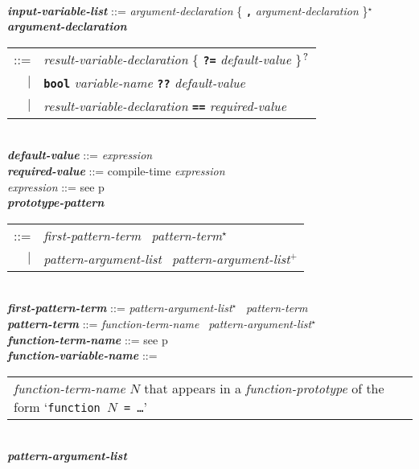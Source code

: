 \documentclass[12pt]{article}
\newcommand{\TT}[1]{{\tt \bfseries #1}}
\newcommand{\STAR}{{\Large $^\star$}}
\newcommand{\PLUS}[1][]{{$^{+#1}$}}
\newcommand{\QMARK}{{$^{\,\mbox{\footnotesize ?}}$}}
\newcommand{\emkey}[1]{{\em \bfseries #1}}
\newcommand{\pagref}[1]{p\pageref{#1}}
\newenvironment{indpar}[1][0.3in]%
	{\begin{list}{}%
		     {\setlength{\itemsep}{0in}%
		      \setlength{\topsep}{0in}%
		      \setlength{\parsep}{1ex}%
		      \setlength{\labelwidth}{#1}%
		      \setlength{\leftmargin}{#1}%
		      \addtolength{\leftmargin}{\labelsep}}%
	 \item}%
	{\end{list}}
\begin{document}
\begin{indpar}
\\[0.5ex]
\emkey{input-variable-list}
    ::= {\em argument-declaration}
                 \{ \TT{,} {\em argument-declaration} \}\STAR{}
\\[0.5ex]
\emkey{argument-declaration}\label{ARGUMENT-DECLARATION} \\
\hspace*{1in}\begin{tabular}[t]{@{}rl@{}}
    ::= & {\em result-variable-declaration}
          \{ \TT{?=} {\em default-value} \}\QMARK{} \\
    $|$ & \TT{bool} {\em variable-name}
          \TT{??} {\em default-value} \\
    $|$ & {\em result-variable-declaration}
          \TT{==} {\em required-value} \\
    \end{tabular}
\\[0.5ex]
\emkey{default-value} ::= {\em expression}
\\[0.5ex]
\emkey{required-value} ::= compile-time {\em expression}
\\[0.5ex]
{\em expression} ::= see \pagref{EXPRESSION}
\\[0.5ex]
\emkey{prototype-pattern}\label{PROTOTYPE-PATTERN}
    \begin{tabular}[t]{rl}
    ::= & {\em first-pattern-term}~ {\em pattern-term}\STAR{} \\
    $|$ & {\em pattern-argument-list}~ {\em pattern-argument-list}\PLUS{}
    \end{tabular}
\\[0.5ex]
\emkey{first-pattern-term} ::= {\em pattern-argument-list}\STAR{}~
				{\em pattern-term}
\\[0.5ex]
\emkey{pattern-term}
    ::= {\em function-term-name}~ {\em pattern-argument-list}\STAR{}
\\[0.5ex]
\emkey{function-term-name} ::= see \pagref{FUNCTION-TERM-NAME}
\\[0.5ex]
\emkey{function-variable-name}\label{FUNCTION-VARIABLE-NAME} ::= \\
\hspace*{1in}
    \begin{tabular}[t]{@{}p{5in}@{}}
    {\em function-term-name} $N$ that appears in a {\em function-prototype}
    of the form `{\tt function $N$ = \ldots}'
    \end{tabular}
\\[0.5ex]
\emkey{pattern-argument-list}\label{PATTERN-ARGUMENT-LIST} \\

\end{indpar}
\end{document}
